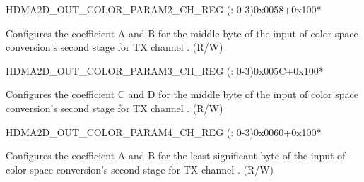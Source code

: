 \begin{register}{H}{DMA2D\_OUT\_COLOR\_PARAM2\_CH\_REG (: 0-3)}{0x0058+0x100*}\label{regdesc:DMA2DOUTCOLORPARAM2CHNREG}
%
%
\regnewline%
\begin{regdesc}\begin{reglist}
\label{fielddesc:DMA2DOUTCOLORPARAMM0CHN}\item [DMA2D\_OUT\_COLOR\_PARAM\_M0\_CH\regindex{n}] Configures the coefficient A and B for the middle byte of the input of color space conversion's second stage for TX channel . (R/W)
\end{reglist}\end{regdesc}
\end{register}


\begin{register}{H}{DMA2D\_OUT\_COLOR\_PARAM3\_CH\_REG (: 0-3)}{0x005C+0x100*}\label{regdesc:DMA2DOUTCOLORPARAM3CHNREG}
%
%
\regnewline%
\begin{regdesc}\begin{reglist}
\label{fielddesc:DMA2DOUTCOLORPARAMM1CHN}\item [DMA2D\_OUT\_COLOR\_PARAM\_M1\_CH\regindex{n}] Configures the coefficient C and D for the middle byte of the input of color space conversion's second stage for TX channel . (R/W)
\end{reglist}\end{regdesc}
\end{register}


\begin{register}{H}{DMA2D\_OUT\_COLOR\_PARAM4\_CH\_REG (: 0-3)}{0x0060+0x100*}\label{regdesc:DMA2DOUTCOLORPARAM4CHNREG}
%
%
\regnewline%
\begin{regdesc}\begin{reglist}
\label{fielddesc:DMA2DOUTCOLORPARAML0CHN}\item [DMA2D\_OUT\_COLOR\_PARAM\_L0\_CH\regindex{n}] Configures the coefficient A and B for the least significant byte of the input of color space conversion's second stage for TX channel . (R/W)
\end{reglist}\end{regdesc}
\end{register}


